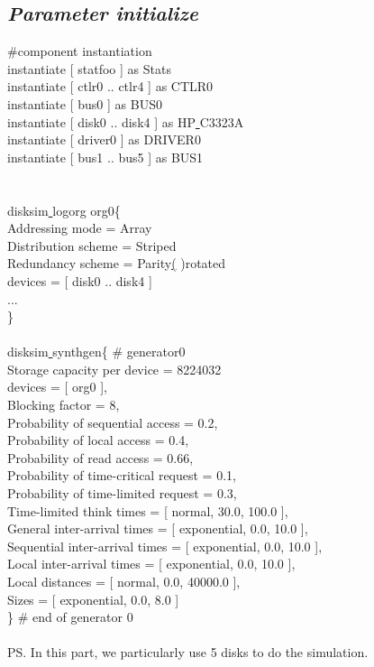 \documentclass[conference]{IEEEtran}
\begin{document}
\subsection{\emph{\textbf{Parameter initialize}}}
\begin{flushleft}
\#component instantiation \\
instantiate [ statfoo ] as Stats\\
instantiate [ ctlr0 .. ctlr4 ] as CTLR0\\
instantiate [ bus0 ] as BUS0\\
instantiate [ disk0 .. disk4 ] as HP\underline{ }C3323A\\
instantiate [ driver0 ] as DRIVER0\\
instantiate [ bus1 .. bus5 ] as BUS1\\
\quad \\\quad  \\
disksim\underline{ }logorg org0\{\\
\quad Addressing mode = Array \\
\quad Distribution scheme = Striped \\
\quad Redundancy scheme = Parity\underline( )rotated \\
\quad devices = [ disk0 .. disk4 ]\\
\quad ...\\
\}\\
\quad \\
disksim\underline{ }synthgen\{ \# generator0 \\
\quad Storage capacity per device  =  8224032\\
\quad  devices = [ org0 ],\\
\quad       Blocking factor =  8,\\
\quad       Probability of sequential access =  0.2,\\
\quad       Probability of local access =  0.4,\\
\quad       Probability of read access =  0.66,\\
\quad       Probability of time-critical request =  0.1,\\
\quad       Probability of time-limited request =  0.3,\\
\quad       Time-limited think times  = [ normal, 30.0, 100.0  ],\\
\quad       General inter-arrival times  = [ exponential, 0.0, 10.0  ],\\
\quad       Sequential inter-arrival times  = [ exponential, 0.0, 10.0  ],\\
\quad       Local inter-arrival times  = [ exponential, 0.0, 10.0  ],\\
\quad       Local distances  = [ normal, 0.0, 40000.0  ],\\
\quad       Sizes  = [ exponential, 0.0, 8.0  ]\\
\} \# end of generator 0  \\
\quad \\
PS. In this part, we particularly use 5 disks to do the simulation.
\end{flushleft}
\end{document}
